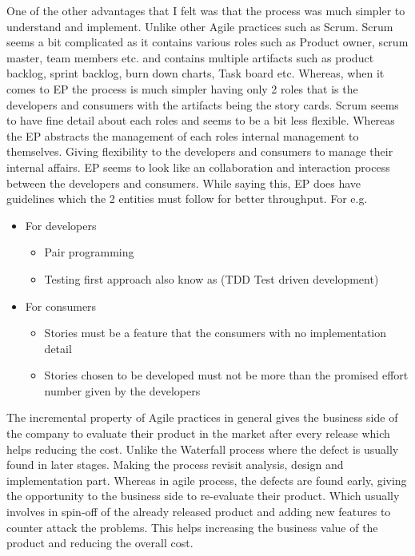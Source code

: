 \documentclass[12pt]{article}
\begin{document}
One of the other advantages that I felt was that the process was much simpler to understand and implement. Unlike other Agile practices such as Scrum. Scrum seems a bit complicated as it contains various roles such as Product owner, scrum master, team members etc. and contains multiple artifacts such as product backlog, sprint backlog, burn down charts, Task board etc. Whereas, when it comes to EP the process is much simpler having only 2 roles that is the developers and consumers with the artifacts being the story cards. Scrum seems to have fine detail about each roles and seems to be a bit less flexible. Whereas the EP abstracts the management of each roles internal management to themselves. Giving flexibility to the developers and consumers to manage their internal affairs. EP seems to look like an collaboration and interaction process between the developers and consumers. While saying this, EP does have guidelines which the 2 entities must follow for better throughput. For e.g. 
\begin{itemize}
    \item For developers
    \begin{itemize}
        \item Pair programming
        \item Testing first approach also know as (TDD Test driven development)
    \end{itemize}
    \item For consumers
    \begin{itemize}
        \item Stories must be a feature that the consumers with no implementation detail
        \item Stories chosen to be developed must not be more than the promised effort number given by the developers
    \end{itemize}
\end{itemize}

The incremental property of Agile practices in general gives the business side of the company to evaluate their product in the market after every release which helps reducing the cost. Unlike the Waterfall process where the defect is usually found in later stages. Making the process revisit analysis, design and implementation part. Whereas in agile process, the defects are found early, giving the opportunity to the business side to re-evaluate their product. Which usually involves in spin-off of the already released product and adding new features to counter attack the problems. This helps increasing the business value of the product and reducing the overall cost.
\end{document}
